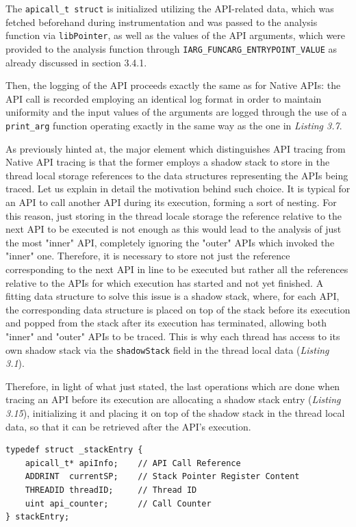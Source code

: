 The \texttt{apicall\_t struct} is initialized utilizing the API-related data, which was fetched beforehand during instrumentation and was passed to the analysis function via \texttt{libPointer}, as well as the values of the API arguments, which were provided to the analysis function through \texttt{IARG\_FUNCARG\_ENTRYPOINT\_VALUE} as already discussed in section 3.4.1.

Then, the logging of the API proceeds exactly the same as for Native APIs: the API call is recorded employing an identical log format in order to maintain uniformity and the input values of the arguments are logged through the use of a \texttt{print\_arg} function operating exactly in the same way as the one in \textit{Listing 3.7}.

As previously hinted at, the major element which distinguishes API tracing from Native API tracing is that the former employs a shadow stack to store in the thread local storage references to the data structures representing the APIs being traced. Let us explain in detail the motivation behind such choice. It is typical for an API to call another API during its execution, forming a sort of nesting. For this reason, just storing in the thread locale storage the reference relative to the next API to be executed is not enough as this would lead to the analysis of just the most "inner" API, completely ignoring the "outer" APIs which invoked the "inner" one. Therefore, it is necessary to store not just the reference corresponding to the next API in line to be executed but rather all the references relative to the APIs for which execution has started and not yet finished. A fitting data structure to solve this issue is a shadow stack, where, for each API, the corresponding data structure is placed on top of the stack before its execution and popped from the stack after its execution has terminated, allowing both "inner" and "outer" APIs to be traced. This is why each thread has access to its own shadow stack via the \texttt{shadowStack} field in the thread local data (\textit{Listing 3.1}).

Therefore, in light of what just stated, the last operations which are done when tracing an API before its execution are allocating a shadow stack entry (\textit{Listing 3.15}), initializing it and placing it on top of the shadow stack in the thread local data, so that it can be retrieved after the API's execution.
\vspace{0.5cm}
\begin{lstlisting}[caption={\texttt{struct} representing a shadow stack entry},captionpos=b]
typedef struct _stackEntry {
	apicall_t* apiInfo;    // API Call Reference
	ADDRINT  currentSP;    // Stack Pointer Register Content
	THREADID threadID;     // Thread ID
	uint api_counter;	   // Call Counter
} stackEntry;
\end{lstlisting}       

